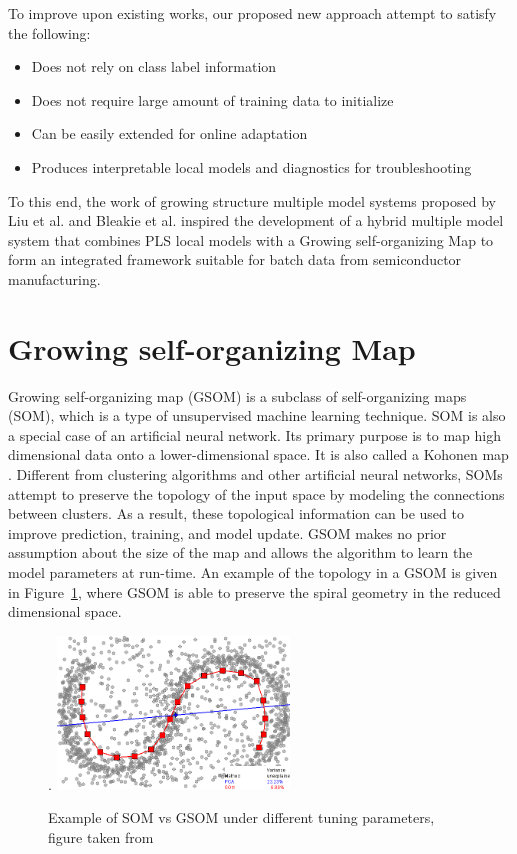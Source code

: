 \documentclass[review,3p]{elsarticle}
\renewcommand\[{\begin{equation}}
\renewcommand\]{\end{equation}}
\begin{document}
To improve upon existing works, our proposed new approach attempt to satisfy the following:
\begin{itemize}
  \item Does not rely on class label information
  \item Does not require large amount of training data to initialize
  \item Can be easily extended for online adaptation
  \item Produces interpretable local models and diagnostics for troubleshooting
\end{itemize}
To this end, the work of growing structure multiple model systems proposed by
Liu et al. \cite{Liu2009} and Bleakie et al. \cite{Bleakie2013} inspired the
development of a hybrid multiple model system that combines PLS local models with a Growing self-organizing Map to form an integrated framework suitable for batch data from semiconductor
manufacturing.

\section{Growing self-organizing Map}
Growing self-organizing map (GSOM) is a subclass of self-organizing maps (SOM),
which is a type of unsupervised machine learning technique. SOM is also a special case of an artificial neural network. Its primary purpose is to map high dimensional data
onto a lower-dimensional space. It is also called a Kohonen map \cite{Kohonen1982}. 
Different from clustering algorithms and other artificial neural networks, SOMs attempt to preserve the topology of the input space by modeling the connections between clusters. As a
result, these topological information can be used to improve prediction, training, and model
update. 
GSOM makes no prior assumption about the
size of the map and allows the algorithm to learn the model parameters at
run-time. 
An example of the topology in a GSOM is given in Figure~\ref{fig:gsom_example}, where GSOM is able to preserve the spiral geometry in the reduced dimensional space.
\begin{figure}.
  \centering
  \includegraphics[width=0.55\textwidth]{figures/gsmms/SOMvsPCA.png}\\
  \caption{Example of SOM vs GSOM under different tuning parameters, figure taken from \cite{Akinduko:2016:SOM:2957613.2957681}}\label{fig:gsom_example}
\end{figure}
\end{document}
